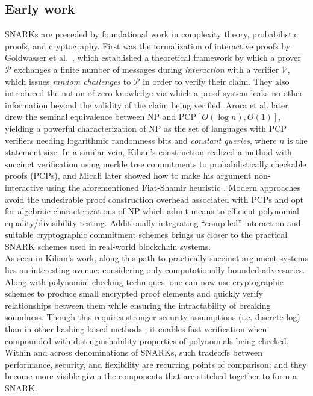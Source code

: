 \subsection{Early work}\label{subsec:early}
\noindent SNARKs are preceded by foundational work in complexity theory, probabilistic proofs, and cryptography. First was the formalization of interactive proofs by Goldwasser et al.\ \cite{ipfirst}, which established a theoretical framework by which a prover $\mathcal{P}$ exchanges a finite number of messages during \textit{interaction} with a verifier $\mathcal{V}$, which issues \textit{random challenges} to $\mathcal{P}$ in order to verify their claim. They also introduced the notion of zero-knowledge via which a proof system leaks no other information beyond the validity of the claim being verified. Arora et al. \cite{pcpthm1, pcpthm2} later drew the seminal equivalence between NP and PCP$[O(\log n), O(1)]$, yielding a powerful characterization of NP as the set of languages with PCP verifiers needing logarithmic randomness bits and \textit{constant queries}, where $n$ is the statement size. In a similar vein, Kilian's construction \cite{kilian} realized a method with succinct verification using merkle tree commitments to probabilistically checkable proofs (PCPs), and Micali later showed how to make his argument non-interactive \cite{micalisnark} using the aforementioned Fiat-Shamir heuristic \cite{fiatshamir}. Modern approaches avoid the undesirable proof construction overhead associated with PCPs and opt for algebraic characterizations of NP which admit means to efficient polynomial equality/divisibility testing. Additionally integrating ``compiled'' interaction and suitable cryptographic commitment schemes brings us closer to the practical SNARK schemes used in real-world blockchain systems.\\

\noindent As seen in Kilian's work, along this path to practically succinct argument systems lies an interesting avenue: considering only computationally bounded adversaries. Along with polynomial checking techniques, one can now use cryptographic schemes to produce small encrypted proof elements and quickly verify relationships between them while ensuring the intractability of breaking soundness. Though this requires stronger security assumptions (i.e. discrete log) than in other hashing-based methods \cite{starks, ligero, hyrax, aurora}, it enables fast verification when compounded with distinguishability properties of polynomials being checked. Within and across denominations of SNARKs, such tradeoffs between performance, security, and flexibility are recurring points of comparison; and they become more visible given the components that are stitched together to form a SNARK.


